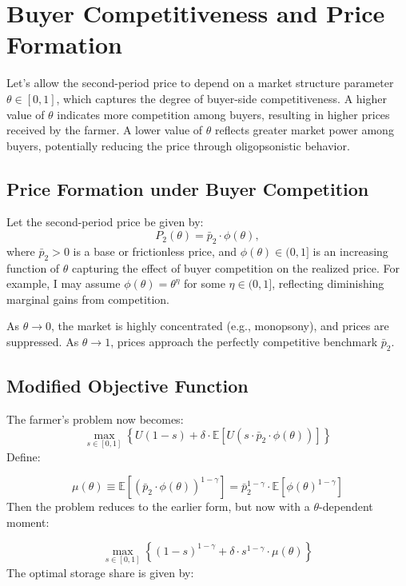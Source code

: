 \documentclass[12pt]{article}
\begin{document}
\section{Buyer Competitiveness and Price Formation}

Let's allow the second-period price to depend on a market structure parameter \( \theta \in [0,1] \), which captures the degree of buyer-side competitiveness. A higher value of \( \theta \) indicates more competition among buyers, resulting in higher prices received by the farmer. A lower value of \( \theta \) reflects greater market power among buyers, potentially reducing the price through oligopsonistic behavior.

\subsection{Price Formation under Buyer Competition}

Let the second-period price be given by:
\[
P_2(\theta) = \bar{p}_2 \cdot \phi(\theta),
\]
where \( \bar{p}_2 > 0 \) is a base or frictionless price, and \( \phi(\theta) \in (0,1] \) is an increasing function of \( \theta \) capturing the effect of buyer competition on the realized price. For example, I may assume \( \phi(\theta) = \theta^\eta \) for some \( \eta \in (0,1] \), reflecting diminishing marginal gains from competition. 

As \( \theta \to 0 \), the market is highly concentrated (e.g., monopsony), and prices are suppressed. As \( \theta \to 1 \), prices approach the perfectly competitive benchmark \( \bar{p}_2 \).

\subsection{Modified Objective Function}

The farmer’s problem now becomes:
\[
\max_{s \in [0,1]} \left\{ U(1 - s) + \delta \cdot \mathbb{E} \left[ U\left( s \cdot \bar{p}_2 \cdot \phi(\theta) \right) \right] \right\}
\]
Define:

\[
\mu(\theta) \equiv \mathbb{E} \left[ \left( \bar{p}_2 \cdot \phi(\theta) \right)^{1 - \gamma} \right] = \bar{p}_2^{1 - \gamma} \cdot \mathbb{E} \left[ \phi(\theta)^{1 - \gamma} \right]
\]
Then the problem reduces to the earlier form, but now with a \( \theta \)-dependent moment:

\[
\max_{s \in [0,1]} \left\{ (1 - s)^{1 - \gamma} + \delta \cdot s^{1 - \gamma} \cdot \mu(\theta) \right\}
\]
The optimal storage share is given by:
\end{document}
